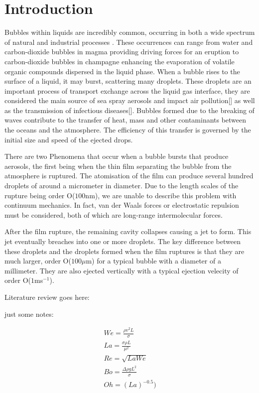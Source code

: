 \section{Introduction}

Bubbles within liquids are incredibly common, occurring in both a wide spectrum of natural and industrial processes \cite{Volcano,bird2010daughter,deike2022mass,dollet2019bubble,feng2014nanoemulsions,oratis2020new,veron2015ocean,WINE}. These occurrences can range from water and carbon-dioxide bubbles in magma providing driving forces for an eruption \cite{Volcano} to carbon-dioxide bubbles in champagne enhancing the evaporation of volatile organic compounds dispersed in the liquid phase. When a bubble rises to the surface of a liquid, it may burst, scattering many droplets. These droplets are an important process of transport exchange across the liquid gas interface\cite{notdoneyet}, they are considered the main source of sea spray aerosols and impact air pollution[] as well as the transmission of infectious diseases[]. Bubbles formed due to the breaking of waves contribute to the transfer of heat, mass and other contaminants between the oceans and the atmosphere. The efficiency of this transfer is governed by the initial size and speed of the ejected drops.

There are two Phenomena that occur when a bubble bursts that produce aerosols, the first being when the thin film separating the bubble from the atmosphere is ruptured. The atomisation of the film can produce several hundred droplets of around a micrometer in diameter. Due to the length scales of the rupture being order O($100$nm), we are unable to describe this problem with continuum mechanics. In fact, van der Waals forces or electrostatic repulsion must be considered, both of which are long-range intermolecular forces.

After the film rupture, the remaining cavity collapses causing a jet to form. This jet eventually breaches into one or more droplets. The key difference between these droplets and the droplets formed when the film ruptures is that they are much larger, order O($100 \mu$m) for a typical bubble with a diameter of a millimeter. They are also ejected vertically with a typical ejection velecity of order O($1$ms$^{-1}$).

Literature review goes here:


just some notes:

\begin{align*}
We = \frac{\rho v^2 L}{\sigma}\\
La = \frac{\sigma \rho L}{\mu^2} \\
Re = \sqrt{LaWe}\\
Bo = \frac{\Delta \rho g L^2}{\sigma}\\
Oh = (La)^{-0.5})\\
\end{align*}
